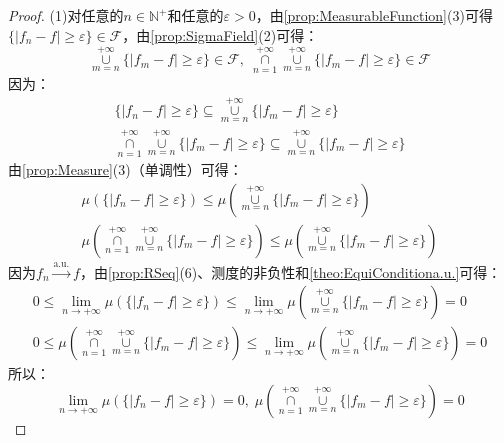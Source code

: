 \begin{proof}
	(1)对任意的$n\in\mathbb{N}^+$和任意的$\varepsilon>0$，由\cref{prop:MeasurableFunction}(3)可得$\{|f_n-f|\geqslant\varepsilon\}\in\mathscr{F}$，由\cref{prop:SigmaField}(2)可得：
	\begin{equation*}
		\underset{m=n}{\overset{+\infty}{\cup}}\{|f_m-f|\geqslant\varepsilon\}\in\mathscr{F},\;\underset{n=1}{\overset{+\infty}{\cap}}\underset{m=n}{\overset{+\infty}{\cup}}\{|f_m-f|\geqslant\varepsilon\}\in\mathscr{F}
	\end{equation*}
	因为：
	\begin{gather*}
		\{|f_n-f|\geqslant\varepsilon\}\subseteq\underset{m=n}{\overset{+\infty}{\cup}}\{|f_m-f|\geqslant\varepsilon\} \\
		\underset{n=1}{\overset{+\infty}{\cap}}\underset{m=n}{\overset{+\infty}{\cup}}\{|f_m-f|\geqslant\varepsilon\}\subseteq\underset{m=n}{\overset{+\infty}{\cup}}\{|f_m-f|\geqslant\varepsilon\}
	\end{gather*}
	由\cref{prop:Measure}(3)（单调性）可得：
	\begin{gather*}
		\mu(\{|f_n-f|\geqslant\varepsilon\})\leqslant\mu\left(\underset{m=n}{\overset{+\infty}{\cup}}\{|f_m-f|\geqslant\varepsilon\}\right) \\
		\mu\left(\underset{n=1}{\overset{+\infty}{\cap}}\underset{m=n}{\overset{+\infty}{\cup}}\{|f_m-f|\geqslant\varepsilon\}\right)\leqslant\mu\left(\underset{m=n}{\overset{+\infty}{\cup}}\{|f_m-f|\geqslant\varepsilon\}\right) 
	\end{gather*}
	因为$f_n\overset{\text{a.u.}}{\longrightarrow}f$，由\cref{prop:RSeq}(6)、测度的非负性和\cref{theo:EquiConditiona.u.}可得：
	\begin{gather*}
		0\leqslant\lim_{n\to+\infty}\mu(\{|f_n-f|\geqslant\varepsilon\})\leqslant\lim_{n\to+\infty}\mu\left(\underset{m=n}{\overset{+\infty}{\cup}}\{|f_m-f|\geqslant\varepsilon\}\right)=0 \\
		0\leqslant\mu\left(\underset{n=1}{\overset{+\infty}{\cap}}\underset{m=n}{\overset{+\infty}{\cup}}\{|f_m-f|\geqslant\varepsilon\}\right)\leqslant\lim_{n\to+\infty}\mu\left(\underset{m=n}{\overset{+\infty}{\cup}}\{|f_m-f|\geqslant\varepsilon\}\right)=0
	\end{gather*}
	所以：
	\begin{equation*}
		\lim_{n\to+\infty}\mu(\{|f_n-f|\geqslant\varepsilon\})=0,\;\mu\left(\underset{n=1}{\overset{+\infty}{\cap}}\underset{m=n}{\overset{+\infty}{\cup}}\{|f_m-f|\geqslant\varepsilon\}\right)=0
	\end{equation*}

\end{proof}
